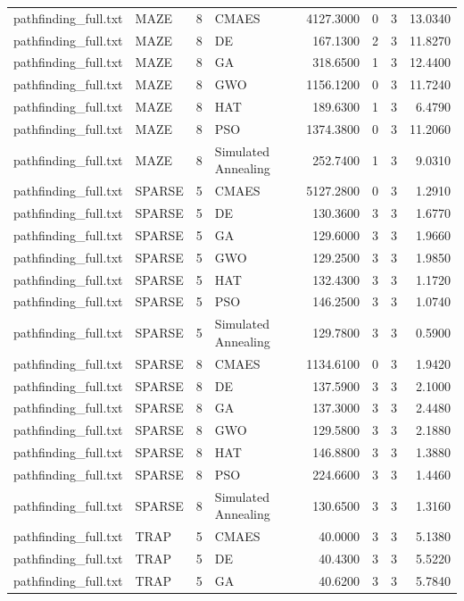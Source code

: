 \begin{tabular}{llrlrrrr}
pathfinding_full.txt & MAZE & 8 & CMAES & 4127.3000 & 0 & 3 & 13.0340 \\
pathfinding_full.txt & MAZE & 8 & DE & 167.1300 & 2 & 3 & 11.8270 \\
pathfinding_full.txt & MAZE & 8 & GA & 318.6500 & 1 & 3 & 12.4400 \\
pathfinding_full.txt & MAZE & 8 & GWO & 1156.1200 & 0 & 3 & 11.7240 \\
pathfinding_full.txt & MAZE & 8 & HAT & 189.6300 & 1 & 3 & 6.4790 \\
pathfinding_full.txt & MAZE & 8 & PSO & 1374.3800 & 0 & 3 & 11.2060 \\
pathfinding_full.txt & MAZE & 8 & Simulated Annealing & 252.7400 & 1 & 3 & 9.0310 \\
pathfinding_full.txt & SPARSE & 5 & CMAES & 5127.2800 & 0 & 3 & 1.2910 \\
pathfinding_full.txt & SPARSE & 5 & DE & 130.3600 & 3 & 3 & 1.6770 \\
pathfinding_full.txt & SPARSE & 5 & GA & 129.6000 & 3 & 3 & 1.9660 \\
pathfinding_full.txt & SPARSE & 5 & GWO & 129.2500 & 3 & 3 & 1.9850 \\
pathfinding_full.txt & SPARSE & 5 & HAT & 132.4300 & 3 & 3 & 1.1720 \\
pathfinding_full.txt & SPARSE & 5 & PSO & 146.2500 & 3 & 3 & 1.0740 \\
pathfinding_full.txt & SPARSE & 5 & Simulated Annealing & 129.7800 & 3 & 3 & 0.5900 \\
pathfinding_full.txt & SPARSE & 8 & CMAES & 1134.6100 & 0 & 3 & 1.9420 \\
pathfinding_full.txt & SPARSE & 8 & DE & 137.5900 & 3 & 3 & 2.1000 \\
pathfinding_full.txt & SPARSE & 8 & GA & 137.3000 & 3 & 3 & 2.4480 \\
pathfinding_full.txt & SPARSE & 8 & GWO & 129.5800 & 3 & 3 & 2.1880 \\
pathfinding_full.txt & SPARSE & 8 & HAT & 146.8800 & 3 & 3 & 1.3880 \\
pathfinding_full.txt & SPARSE & 8 & PSO & 224.6600 & 3 & 3 & 1.4460 \\
pathfinding_full.txt & SPARSE & 8 & Simulated Annealing & 130.6500 & 3 & 3 & 1.3160 \\
pathfinding_full.txt & TRAP & 5 & CMAES & 40.0000 & 3 & 3 & 5.1380 \\
pathfinding_full.txt & TRAP & 5 & DE & 40.4300 & 3 & 3 & 5.5220 \\
pathfinding_full.txt & TRAP & 5 & GA & 40.6200 & 3 & 3 & 5.7840 \\

\end{tabular}
